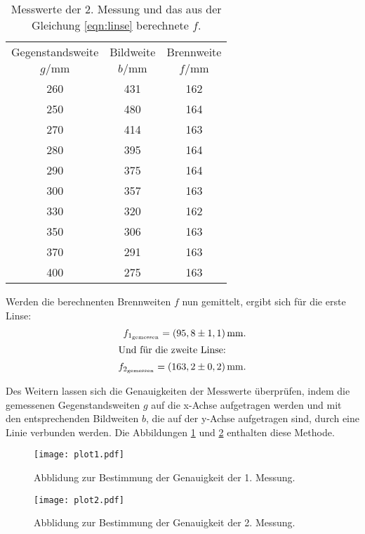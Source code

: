 \FloatBarrier
\begin{table}
  \centering
  \caption{Messwerte der 2. Messung und das aus der Gleichung
   \eqref{eqn:linse} berechnete $f$.}
  \label{tab:2}
  \begin{tabular}{c c c}
  \toprule
  Gegenstandsweite   & Bildweite & Brennweite\\
  $g/\si{\milli\meter}$ & $b/\si{\milli\meter}$ & $f/\si{\milli\meter}$\\
  \midrule
  260  &  431 & 162\\
  250  &  480 & 164\\
  270  &  414 & 163\\
  280  &  395 & 164\\
  290  &  375 & 164\\
  300  &  357 & 163\\
  330  &  320 & 162\\
  350  &  306 & 163\\
  370  &  291 & 163\\
  400  &  275 & 163\\
  \bottomrule
\end{tabular}
\end{table}
\FloatBarrier
Werden die berechnenten Brennweiten $f$
nun gemittelt, ergibt sich für die erste Linse:
\begin{align*}
  f_{1_\mathrm{gemessen}}=(95,8\pm1,1)\,\si{\milli\meter}.\\
\intertext{Und für die zweite Linse:}
f_{2_\mathrm{gemessen}}=(163,2\pm0,2)\,\si{\milli\meter}.
\end{align*}

Des Weitern lassen sich die Genauigkeiten der Messwerte überprüfen,
indem die gemessenen Gegenstandsweiten $g$ auf die x-Achse aufgetragen werden
und mit den entsprechenden Bildweiten $b$, die auf der y-Achse aufgetragen sind,
durch eine Linie verbunden werden. Die Abbildungen \ref{fig:1} und \ref{fig:2}
enthalten diese Methode.

\begin{figure}
 \centering
 \texttt{[image: plot1.pdf]}
 \caption{Abblidung zur Bestimmung der Genauigkeit der 1. Messung.}
 \label{fig:1}
\end{figure}
\FloatBarrier
\begin{figure}
 \centering
 \texttt{[image: plot2.pdf]}
 \caption{Abblidung zur Bestimmung der Genauigkeit der 2. Messung.}
 \label{fig:2}
\end{figure}
\FloatBarrier
